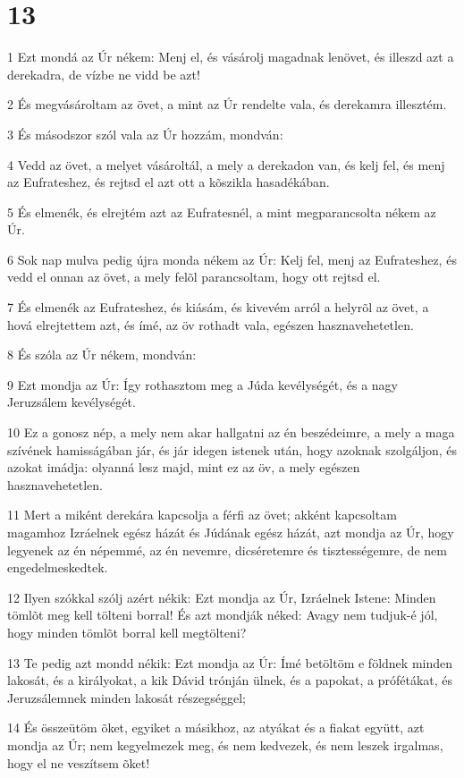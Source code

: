 \chapter{13}

\par 1 Ezt mondá az Úr nékem: Menj el, és vásárolj magadnak lenövet, és illeszd azt a derekadra, de vízbe ne vidd be azt!
\par 2 És megvásároltam az övet, a mint az Úr rendelte vala, és derekamra illesztém.
\par 3 És másodszor szól vala az Úr hozzám, mondván:
\par 4 Vedd az övet, a melyet vásároltál, a mely a derekadon van, és kelj fel, és menj az Eufrateshez, és rejtsd el azt ott a kõszikla hasadékában.
\par 5 És elmenék, és elrejtém azt az Eufratesnél, a mint megparancsolta nékem az Úr.
\par 6 Sok nap mulva pedig újra monda nékem az Úr: Kelj fel, menj az Eufrateshez, és vedd el onnan az övet, a mely felõl parancsoltam, hogy ott rejtsd el.
\par 7 És elmenék az Eufrateshez, és kiásám, és kivevém arról a helyrõl az övet, a hová elrejtettem azt, és ímé, az öv rothadt vala, egészen hasznavehetetlen.
\par 8 És szóla az Úr nékem, mondván:
\par 9 Ezt mondja az Úr: Így rothasztom meg a Júda kevélységét, és a nagy Jeruzsálem kevélységét.
\par 10 Ez a gonosz nép, a mely nem akar hallgatni  az én beszédeimre, a mely a maga szívének hamisságában jár, és jár idegen istenek után, hogy azoknak szolgáljon, és azokat imádja: olyanná lesz majd, mint ez az öv, a mely egészen hasznavehetetlen.
\par 11 Mert a miként derekára kapcsolja a férfi az övet; akként kapcsoltam magamhoz Izráelnek egész házát és Júdának egész házát, azt mondja az Úr, hogy legyenek az én népemmé, az én nevemre, dicséretemre és tisztességemre, de nem engedelmeskedtek.
\par 12 Ilyen szókkal szólj azért nékik: Ezt mondja az Úr, Izráelnek Istene: Minden tömlõt meg kell tölteni borral! És azt mondják néked: Avagy nem tudjuk-é jól, hogy minden tömlõt borral kell megtölteni?
\par 13 Te pedig azt mondd nékik: Ezt mondja az Úr: Ímé betöltöm e földnek minden lakosát, és a királyokat, a kik Dávid trónján ülnek, és a papokat, a prófétákat, és Jeruzsálemnek minden lakosát részegséggel;
\par 14 És összeütöm õket, egyiket a másikhoz, az atyákat és a fiakat együtt, azt mondja az Úr; nem kegyelmezek meg, és nem kedvezek, és nem leszek irgalmas, hogy el ne veszítsem õket!
